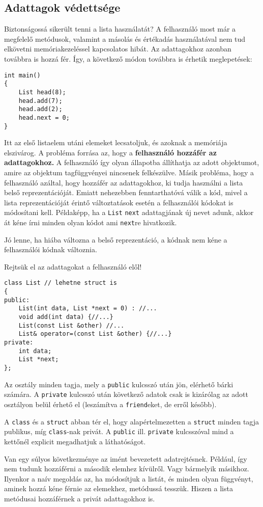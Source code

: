 \documentclass[a4paper,11.5pt,table]{article}
\begin{document}
	\subsection{Adattagok védettsége}
	Biztonságossá sikerült tenni a lista használatát? A felhasználó most már a megfelelő metódusok, valamint a másolás és értékadás használatával nem tud elkövetni memóriakezeléssel kapcsolatos hibát. Az adattagokhoz azonban továbbra is hozzá fér. Így, a következő módon továbbra is érhetik meglepetések:
	\begin{lstlisting}
int main()
{
	List head(8);
	head.add(7);
	head.add(2);
	head.next = 0;
}
	\end{lstlisting}
	Itt az első listaelem utáni elemeket lecsatoljuk, és azoknak a memóriája elszivárog. A probléma forrása az, hogy a \textbf{felhasználó hozzáfér az adattagokhoz.} A felhasználó így olyan állapotba állíthatja az adott objektumot, amire az objektum tagfüggvényei nincsenek felkészülve. Másik probléma, hogy a felhasználó azáltal, hogy hozzáfér az adattagokhoz, ki tudja használni a lista belső reprezentációját. Emiatt nehezebben fenntarthatóvá válik a kód, mivel a lista reprezentációját érintő változtatások esetén a felhasználói kódokat is módosítani kell. Példaképp, ha a \texttt{List} \texttt{next} adattagjának új nevet adunk, akkor át kéne írni minden olyan kódot ami \texttt{next}re hivatkozik.
	
	Jó lenne, ha hiába változna a belső reprezentáció, a kódnak nem kéne a felhasználói kódnak változnia. 
	
	Rejtsük el az adattagokat a felhasználó elől!

\begin{lstlisting}
class List // lehetne struct is
{
public:
	List(int data, List *next = 0) : //...
	void add(int data) {//...}
	List(const List &other) //...
	List& operator=(const List &other) {//...}
private:
	int data;
	List *next;
};
\end{lstlisting}
  Az osztály minden tagja, mely a \texttt{public} kulcsszó után jön, elérhető bárki számára. A \texttt{private} kulcsszó után következő adatok csak is kizárólag az adott osztályon belül érhető el (leszámítva a \texttt{friend}eket, de erről később).

	A \texttt{class} és a \texttt{struct} abban tér el, hogy alapértelmezetten a \texttt{struct} minden tagja publikus, míg \texttt{class}-nak privát. A \texttt{public} ill. \texttt{private} kulcsszóval mind a kettőnél explicit megadhatjuk a láthatóságot.
	
	\medskip
	Van egy súlyos következménye az imént bevezetett adatrejtésnek. Például, így nem tudunk hozzáférni a második elemhez kívülről. Vagy bármelyik másikhoz. Ilyenkor a naív megoldás az, ha módosítjuk a listát, és minden olyan függvényt, aminek hozzá kéne férnie az elemekhez, metódussá tesszük. Hiszen a lista metódusai hozzáférnek a privát adattagokhoz is.
	
\end{document}
